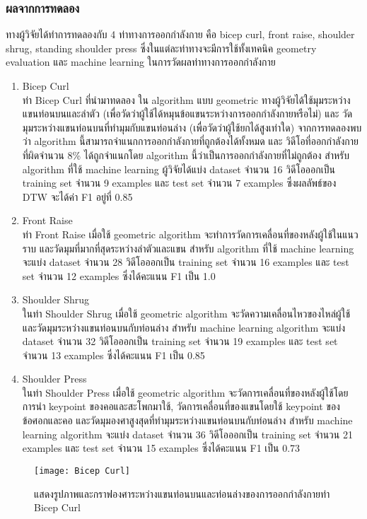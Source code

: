 \subsubsection{ผลจากการทดลอง}
ทางผู้วิจัยได้ทำการทดลองกับ 4 ท่าทางการออกกำลังกาย คือ bicep curl, front raise, shoulder shrug, standing shoulder press ซึ่งในแต่ละท่าทางจะมีการใช้ทั้งเทคนิค geometry evaluation และ machine learning ในการวัดผลท่าทางการออกกำลังกาย
\begin{enumerate}
    \item Bicep Curl\\
    ท่า Bicep Curl ที่นำมาทดลอง ใน algorithm แบบ geometric ทางผู้วิจัยได้ใช้มุมระหว่างแขนท่อนบนและลำตัว (เพื่อวัดว่าผู้ใช้ได้หมุนข้อแขนระหว่างการออกกำลังกายหรือไม่) และ วัดมุมระหว่างแขนท่อนบนที่ทำมุมกับแขนท่อนล่าง (เพื่อวัดว่าผู้ใช้ยกได้สูงเท่าใด) จากการทดลองพบว่า algorithm นี้สามารถจำแนกการออกกำลังกายที่ถูกต้องได้ทั้งหมด และ วิดีโอที่ออกกำลังกายที่ผิดจำนวน 8\% ได้ถูกจำแนกโดย algorithm นี้ว่าเป็นการออกกำลังกายที่ไม่ถูกต้อง สำหรับ algorithm ที่ใช้ machine learning ผู้วิจัยได้แบ่ง dataset จำนวน 16 วิดีโอออกเป็น training set จำนวน 9 examples และ test set จำนวน 7 examples ซึ่งผลลัพธ์ของ DTW จะได้ค่า F1 อยู่ที่ 0.85
    \item Front Raise\\
    ท่า Front Raise เมื่อใช้ geometric algorithm จะทำการวัดการเคลื่อนที่ของหลังผู้ใช้ในแนวราบ และวัดมุมที่มากที่สุดระหว่างลำตัวและแขน สำหรับ algorithm ที่ใช้ machine learning จะแบ่ง dataset จำนวน 28 วิดีโอออกเป็น training set จำนวน 16 examples และ test set จำนวน 12 examples ซึ่งได้คะแนน F1 เป็น 1.0
    \item Shoulder Shrug\\
    ในท่า Shoulder Shrug เมื่อใช้ geometric algorithm จะวัดความเคลื่อนไหวของไหล่ผู้ใช้ และวัดมุมระหว่างแขนท่อนบนกับท่อนล่าง สำหรับ machine learning algorithm จะแบ่ง dataset จำนวน 32 วิดีโอออกเป็น training set จำนวน 19 examples และ test set จำนวน 13 examples ซึ่งได้คะแนน F1 เป็น 0.85
    \item Shoulder Press\\
    ในท่า Shoulder Press เมื่อใช้ geometric algorithm จะวัดการเคลื่อนที่ของหลังผู้ใช้โดยการนำ keypoint ของคอและสะโพกมาใช้, วัดการเคลื่อนที่ของแขนโดยใช้ keypoint ของข้อศอกและคอ และวัดมุมองศาสูงสุดที่ทำมุมระหว่างแขนท่อนบนกับท่อนล่าง สำหรับ machine learning algorithm จะแบ่ง dataset จำนวน 36 วิดีโอออกเป็น training set จำนวน 21 examples และ test set จำนวน 15 examples ซึ่งได้คะแนน F1 เป็น 0.73
\end{enumerate}

\begin{figure}
    \texttt{[image: Bicep Curl]}
    \caption{แสดงรูปภาพและกราฟองศาระหว่างแขนท่อนบนและท่อนล่างของการออกกำลังกายท่า Bicep Curl}
\end{figure}

